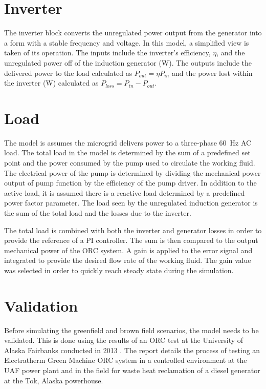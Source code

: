 \section{Inverter}
The inverter block converts the unregulated power output from the generator into a form with a stable frequency and voltage. In this model, a simplified view is taken of its operation. The inputs include the inverter's efficiency, $\eta$, and the unregulated power off of the induction generator (\si{\watt}). The outputs include the delivered power to the load calculated as $P_{out} = \eta P_{in}$  and the power lost within the inverter (\si{\watt}) calculated as $P_{loss} = P_{in} - P_{out}$. 

\section{Load}
The model is assumes the microgrid delivers power to a three-phase \SI{60}{\hertz} AC load. The total load in the model is determined by the sum of a predefined set point and the power consumed by the pump used to circulate the working fluid. The electrical power of the pump is determined by dividing the mechanical power output of pump function by the efficiency of the pump driver. In addition to the active load, it is assumed there is a reactive load determined by a predefined power factor parameter. 
The load seen by the unregulated induction generator is the sum of the total load and the losses due to the inverter. 

The total load is combined with both the inverter and generator losses in order to provide the reference of a PI controller. The sum is then compared to the output mechanical power of the ORC system. A gain is applied to the error signal and integrated to provide the desired flow rate of the working fluid. The gain value was selected in order to quickly reach steady state during the simulation.

\section{Validation}
Before simulating  the greenfield and brown field scenarios, the model needs to be validated. This is done using the results of an ORC test at the University of Alaska Fairbanks conducted in 2013 \cite{Lin2014}. The report details the process of testing an Electratherm Green Machine ORC system in a controlled environment at the UAF power plant and in the field for waste heat reclamation of a diesel generator at the Tok, Alaska powerhouse.

